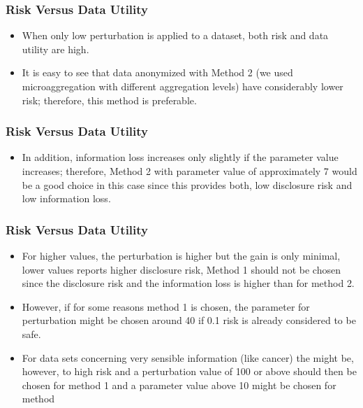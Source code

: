 \documentclass{beamer}
\begin{document}
\begin{frame}
	\frametitle{Risk Versus Data Utility}
\begin{itemize}
\item When
only low perturbation is applied to a dataset, both risk and data utility are high. 
\item It
is easy to see that data anonymized with Method 2 (we used microaggregation with
different aggregation levels) have considerably lower risk; therefore, this method
is preferable.
\end{itemize}
\end{frame}
\begin{frame}
		\frametitle{Risk Versus Data Utility}
\begin{itemize}
\item In addition, information loss increases only slightly if the parameter
value increases; therefore, Method 2 with parameter value of approximately 7
would be a good choice in this case since this provides both, low disclosure risk
and low information loss. 
\end{itemize}
\end{frame}
\begin{frame}
	\frametitle{Risk Versus Data Utility}
	\begin{itemize}
\item For higher values, the perturbation is higher but the
gain is only minimal, lower values reports higher disclosure risk, Method 1 should
not be chosen since the disclosure risk and the information loss is higher than for
method 2. \item However, if for some reasons method 1 is chosen, the parameter for
perturbation might be chosen around 40 if 0.1 risk is already considered to be
safe. 
\item For data sets concerning very sensible information (like cancer) the might
be, however, to high risk and a perturbation value of 100 or above should then be
chosen for method 1 and a parameter value above 10 might be chosen for method
\end{itemize}
\end{frame}
\end{document}
